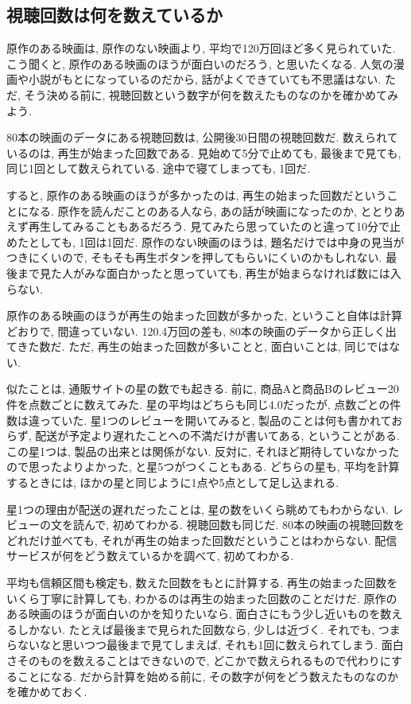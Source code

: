   \subsection{視聴回数は何を数えているか}

    原作のある映画は, 原作のない映画より, 平均で120万回ほど多く見られていた.
    こう聞くと, 原作のある映画のほうが面白いのだろう, と思いたくなる.
    人気の漫画や小説がもとになっているのだから, 話がよくできていても不思議はない.
    ただ, そう決める前に, 視聴回数という数字が何を数えたものなのかを確かめてみよう.

    80本の映画のデータにある視聴回数は, 公開後30日間の視聴回数だ.
    数えられているのは, 再生が始まった回数である.
    見始めて5分で止めても, 最後まで見ても, 同じ1回として数えられている.
    途中で寝てしまっても, 1回だ.

    すると, 原作のある映画のほうが多かったのは, 再生の始まった回数だということになる.
    原作を読んだことのある人なら, あの話が映画になったのか, ととりあえず再生してみることもあるだろう.
    見てみたら思っていたのと違って10分で止めたとしても, 1回は1回だ.
    原作のない映画のほうは, 題名だけでは中身の見当がつきにくいので, そもそも再生ボタンを押してもらいにくいのかもしれない.
    最後まで見た人がみな面白かったと思っていても, 再生が始まらなければ数には入らない.

    原作のある映画のほうが再生の始まった回数が多かった, ということ自体は計算どおりで, 間違っていない.
    120.4万回の差も, 80本の映画のデータから正しく出てきた数だ.
    ただ, 再生の始まった回数が多いことと, 面白いことは, 同じではない.

    似たことは, 通販サイトの星の数でも起きる.
    前に, 商品Aと商品Bのレビュー20件を点数ごとに数えてみた.
    星の平均はどちらも同じ4.0だったが, 点数ごとの件数は違っていた.
    星1つのレビューを開いてみると, 製品のことは何も書かれておらず, 配送が予定より遅れたことへの不満だけが書いてある, ということがある.
    この星1つは, 製品の出来とは関係がない.
    反対に, それほど期待していなかったので思ったよりよかった, と星5つがつくこともある.
    どちらの星も, 平均を計算するときには, ほかの星と同じように1点や5点として足し込まれる.

    星1つの理由が配送の遅れだったことは, 星の数をいくら眺めてもわからない.
    レビューの文を読んで, 初めてわかる.
    視聴回数も同じだ.
    80本の映画の視聴回数をどれだけ並べても, それが再生の始まった回数だということはわからない.
    配信サービスが何をどう数えているかを調べて, 初めてわかる.

    平均も信頼区間も検定も, 数えた回数をもとに計算する.
    再生の始まった回数をいくら丁寧に計算しても, わかるのは再生の始まった回数のことだけだ.
    原作のある映画のほうが面白いのかを知りたいなら, 面白さにもう少し近いものを数えるしかない.
    たとえば最後まで見られた回数なら, 少しは近づく.
    それでも, つまらないなと思いつつ最後まで見てしまえば, それも1回に数えられてしまう.
    面白さそのものを数えることはできないので, どこかで数えられるもので代わりにすることになる.
    だから計算を始める前に, その数字が何をどう数えたものなのかを確かめておく.

